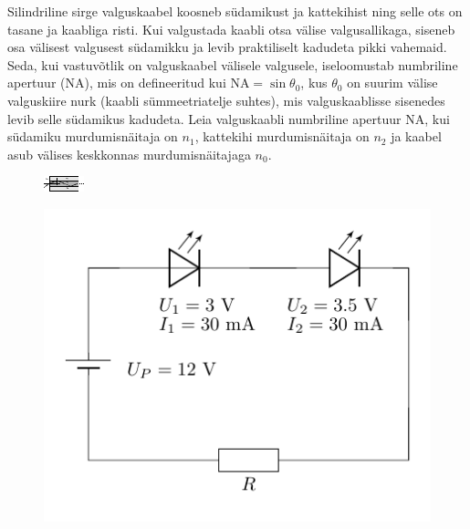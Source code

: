 \documentclass[10pt]{article}
\begin{document}
Silindriline sirge valguskaabel koosneb südamikust ja kattekihist ning selle ots on tasane ja kaabliga risti. Kui valgustada kaabli otsa välise valgusallikaga, siseneb osa välisest valgusest südamikku ja levib praktiliselt kadudeta pikki vahemaid. Seda, kui vastuvõtlik on valguskaabel välisele valgusele, iseloomustab numbriline apertuur (NA), mis on defineeritud kui $\text{NA} = \sin \theta_0$, kus $\theta_0$ on suurim välise valguskiire nurk (kaabli sümmeetriatelje suhtes), mis valguskaablisse sisenedes levib selle südamikus kadudeta. Leia valguskaabli numbriline apertuur NA, kui südamiku murdumisnäitaja on $n_1$, kattekihi murdumisnäitaja on $n_2$ ja kaabel asub välises keskkonnas murdumisnäitajaga $n_0$.
\begin{figure}[h]
    \centering
    \includegraphics[width=.7\linewidth]{2024-lahg-03-yl.pdf}
\end{figure}
\probend
\bigskip


\begin{figure}
  \vspace{-30pt}
  \begin{center}
  \includegraphics[scale=0.8]{2024-v2g-03-yl.pdf}
  \vspace{-20pt}
  \end{center}
\end{figure}
\end{document}

